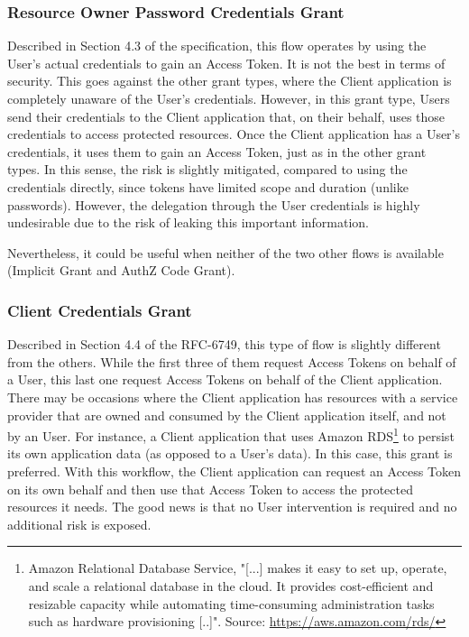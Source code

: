 \documentclass[a4paper,12pt]{article}
\def\rfc#1{RFC-#1\xspace}
\begin{document}
\subsubsection{Resource Owner Password Credentials Grant}
Described in Section 4.3 of the specification, this flow operates by using the User's actual credentials to gain an Access Token. It is not the best in terms of security. This goes against the other grant types, where the Client application is completely unaware of the User's credentials. However, in this grant type, Users send their credentials to the Client application that, on their behalf, uses those credentials to access protected resources.
Once the Client application has a User's credentials, it uses them to gain an Access Token, just as in the other grant types. In this sense, the risk is slightly mitigated, compared to using the credentials directly, since tokens have limited scope and duration (unlike passwords). However, the delegation through the User credentials is highly undesirable due to the risk of leaking this important information.

Nevertheless, it could be useful when neither of the two other flows is available (Implicit Grant and AuthZ Code Grant).

\subsubsection{Client Credentials Grant}
Described in Section 4.4 of the \rfc{6749}, this type of flow is slightly different from the others. While the first three of them request Access Tokens on behalf of a User, this last one request Access Tokens on behalf of the Client application. There may be occasions where the Client application has resources with a service provider that are owned and consumed by the Client application itself, and not by an User. For instance, a Client application that uses Amazon RDS\footnote{Amazon Relational Database Service, "[...] makes it easy to set up, operate, and scale a relational database in the cloud. It provides cost-efficient and resizable capacity while automating time-consuming administration tasks such as hardware provisioning [..]". Source: \url{https://aws.amazon.com/rds/}} to persist its own application data (as opposed to a User's data). In this case, this grant is preferred. With this workflow, the Client application can request an Access Token on its own behalf and then use that Access Token to access the protected resources it needs. The good news is that no User intervention is required and no additional risk is exposed.
\end{document}
